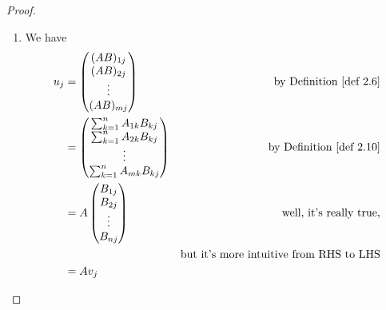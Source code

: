 \begin{proof} \ 
\begin{enumerate}
\item We have
\begin{align*}
    u_j & = \begin{pmatrix}
            (AB)_{1j} \\
            (AB)_{2j} \\
            \vdots \\
            (AB)_{mj}
        \end{pmatrix} & \text{by \DEF{2.6}} \\
        & = \begin{pmatrix}
            \sum_{k = 1}^{n} A_{1k} B_{kj} \\
            \sum_{k = 1}^{n} A_{2k} B_{kj} \\
            \vdots \\
            \sum_{k = 1}^{n} A_{mk} B_{kj} \\
        \end{pmatrix} & \text{by \DEF{2.10}} \\
        & = A \begin{pmatrix}
            B_{1j} \\
            B_{2j} \\
            \vdots \\
            B_{nj}
        \end{pmatrix} & \text{well, it's really true,} \\
        & & \text{but it's more intuitive from RHS to LHS} \\
        & = A v_j
\end{align*}


\end{enumerate}
\end{proof}
